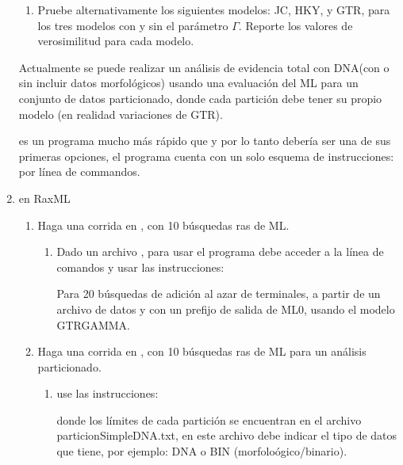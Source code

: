 \begin{enumerate}
\begin{enumerate}
		\item Pruebe alternativamente los siguientes modelos: JC, HKY, y GTR, para los tres modelos con y sin el par\'ametro $\Gamma$. Reporte los valores de verosimilitud para cada modelo.


	\end{enumerate}


  Actualmente se puede realizar un an\'alisis de evidencia total con DNA(con o
  sin incluir datos morfol\'ogicos) usando una evaluaci\'on del ML para un conjunto de datos particionado, donde cada partici\'on debe tener su propio modelo (en realidad variaciones de GTR).

   es un programa mucho m\'as r\'apido que  y por lo tanto deber\'ia ser una de sus primeras opciones, el programa cuenta con un solo esquema de instrucciones: por l\'inea de commandos.

  \item{en RaxML}

	\begin{enumerate}
		\item Haga una corrida en , con 10 b\'usquedas ras de ML.
		\begin{enumerate}
			\item Dado un archivo , para usar el programa debe acceder a la l\'inea de comandos y usar las instrucciones:

			
			Para 20 b\'usquedas de adici\'on al azar de terminales, a partir de un archivo de datos   y con un prefijo de salida de ML0, usando el modelo GTRGAMMA.

		\end{enumerate}

		\item Haga una corrida en , con 10 b\'usquedas ras de ML para un an\'alisis particionado.

		    \begin{enumerate}
			  \item  use las instrucciones: 

			  donde los l\'imites de cada partici\'on se encuentran en el archivo
        particionSimpleDNA.txt, en este archivo debe indicar el tipo de datos
        que tiene, por ejemplo: DNA o BIN (morfolo\'ogico/binario).


\end{enumerate}
\end{enumerate}
\end{enumerate}
